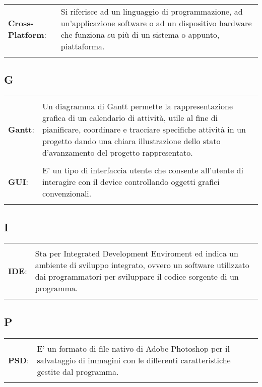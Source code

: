 {{{\begin{longtable}{p{} p{}}
		\\
		\textbf{Cross-Platform}:		&	 Si riferisce ad un linguaggio di programmazione, ad un'applicazione software o ad un dispositivo hardware che funziona su più di un sistema o appunto, piattaforma.\\
	\end{longtable}
	
	\subsection{G}{
		\normalsize
		\begin{longtable}{p{} p{}} 
			\\
			\textbf{Gantt}:		&	 Un diagramma di Gantt permette la rappresentazione grafica di un calendario di attività, utile al fine di pianificare, coordinare e tracciare specifiche attività in un progetto dando una chiara illustrazione dello stato d'avanzamento del progetto rappresentato.\\
			\\
			\textbf{GUI}:		&	 E' un tipo di interfaccia utente che consente all'utente di interagire con il device controllando oggetti grafici convenzionali.\\
		\end{longtable}
		
	\subsection{I}{
		\normalsize
		\begin{longtable}{p{} p{}} 
			\\
			\textbf{IDE}:		&	 Sta per Integrated Development Enviroment ed indica un ambiente di sviluppo integrato, ovvero un software utilizzato dai programmatori per sviluppare il codice sorgente di un programma.\\
		\end{longtable}

	\subsection{P}{
		\normalsize
		\begin{longtable}{p{} p{}} 
			\\
			\textbf{PSD}:		&	 E' un formato di file nativo di Adobe Photoshop per il salvataggio di immagini con le differenti caratteristiche gestite dal programma. \\
		\end{longtable}

}}}}}}
